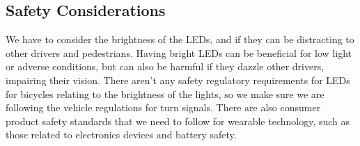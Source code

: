 \documentclass[12pt]{article}
\begin{document}
\subsection{Safety Considerations}
We have to consider the brightness of the LEDs, and if they can be distracting to other drivers and pedestrians. Having bright LEDs can be beneficial for low light or adverse conditions, but can also be harmful if they dazzle other drivers, impairing their vision. There aren’t any safety regulatory requirements for LEDs for bicycles relating to the brightness of the lights, so we make sure we are following the vehicle regulations for turn signals. \cite{CFR571_108} There are also consumer product safety standards that we need to follow for wearable technology, such as those related to electronics devices and battery safety.


\newpage

\end{document}
